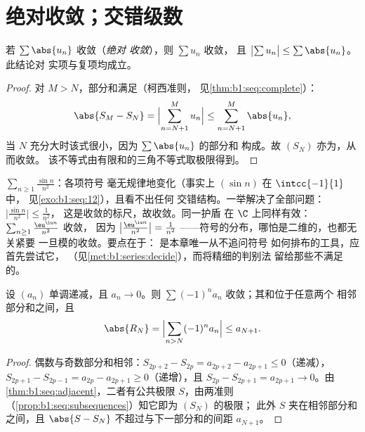 \section{绝对收敛；交错级数}

\begin{theorem}[绝对收敛]\label{thm:b1:series:absolute}
若 $\sum \abs{u_n}$ 收敛（\emph{绝对
收敛}），则 $\sum u_n$ 收敛，
且 $\bigl|\sum u_n\bigr| \leq \sum \abs{u_n}$。此结论对
实项与复项均成立。
\end{theorem}

\begin{proof}
对 $M > N$，部分和满足（柯西准则，
见\cref{thm:b1:seq:complete}）：
\[
\abs{S_M - S_N} = \Bigl| \sum_{n=N+1}^{M} u_n \Bigr|
\leq \sum_{n=N+1}^{M} \abs{u_n},
\]
当 $N$ 充分大时该式很小，因为 $\sum\abs{u_n}$ 的部分和
构成。故 $(S_N)$ 亦为，从而收敛。
该不等式由有限和的三角不等式取极限得到。
\end{proof}

\begin{example}\label{ex:b1:series:absexamples}
$\sum_{n\geq1} \frac{\sin n}{n^2}$：各项符号
毫无规律地变化（事实上 $(\sin n)$ 在 $\intcc{-1}{1}$ 中，
见\cref{exo:b1:seq:12}），且看不出任何
交错结构。一举解决了全部问题：
$\bigl|\frac{\sin n}{n^2}\bigr| \leq \frac{1}{n^2}$，
这是收敛的标尺，故收敛。同一护盾
在 $\C$ 上同样有效：$\sum_{n\geq1}\frac{\eu^{\iu n}}{n^2}$ 收敛，
因为 $\bigl|\frac{\eu^{\iu n}}{n^2}\bigr| = \frac{1}{n^2}$
——符号的分布，哪怕是二维的，也都无关紧要
一旦模的收敛。要点在于：
是本章唯一从不追问符号
如何排布的工具，应首先尝试它，
（见\cref{met:b1:series:decide}），而将精细的判别法
留给那些不满足的。
\end{example}

\begin{theorem}[交错级数判别法]\label{thm:b1:series:alternating}
设 $(a_n)$ 单调递减，且 $a_n \to 0$。则 $\sum (-1)^n a_n$ 收敛；其和位于任意两个
相邻部分和之间，且
\[
\abs{R_N} = \Bigl| \sum_{n > N} (-1)^n a_n \Bigr| \leq a_{N+1} .
\]
\end{theorem}

\begin{proof}
偶数与奇数部分和相邻：$S_{2p+2} - S_{2p} =
a_{2p+2} - a_{2p+1} \leq 0$（递减），$S_{2p+1} - S_{2p-1} =
a_{2p} - a_{2p+1} \geq 0$（递增），且 $S_{2p} - S_{2p+1} =
a_{2p+1} \to 0$。由\cref{thm:b1:seq:adjacent}，二者有公共极限
$S$，由两准则
（\cref{prop:b1:seq:subsequences}）知它即为 $(S_N)$ 的极限；
此外 $S$ 夹在相邻部分和之间，且
$\abs{S - S_N}$ 不超过与下一部分和的间距 $a_{N+1}$。
\end{proof}


